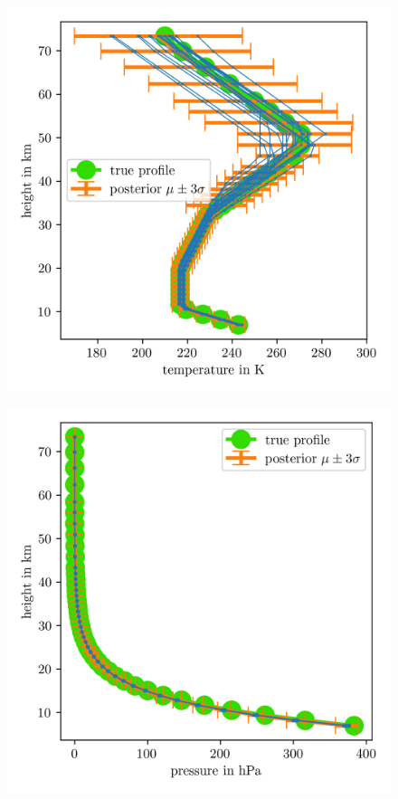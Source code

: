 \begin{figure}[ht!]
	\centering
	\includegraphics{TempPostMeanSigm.png}
	\caption[]{}
	\label{fig:}
\end{figure}

\begin{figure}[ht!]
	\centering
	\includegraphics{PressPostMeanSigm.png}
	\caption[]{}
	\label{fig:}
\end{figure}



